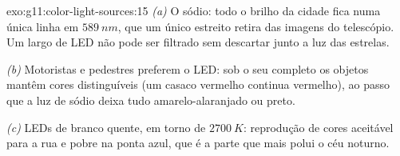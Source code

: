 \begin{solution}{exo:g11:color-light-sources:15}
\emph{(a)} O sódio: todo o brilho da cidade fica numa única linha em
$\qty{589}{nm}$, que um único  estreito retira das imagens do
telescópio. Um  largo de LED não pode ser filtrado sem descartar
junto a luz das estrelas.

\emph{(b)} Motoristas e pedestres preferem o LED: sob o seu 
completo os objetos mantêm cores distinguíveis (um casaco vermelho
continua vermelho), ao passo que a luz de sódio deixa tudo
amarelo-alaranjado ou preto.

\emph{(c)} LEDs de branco quente, em torno de $\qty{2700}{K}$: reprodução
de cores aceitável para a rua e  pobre na ponta azul, que é a
parte que mais polui o céu noturno.
\end{solution}

